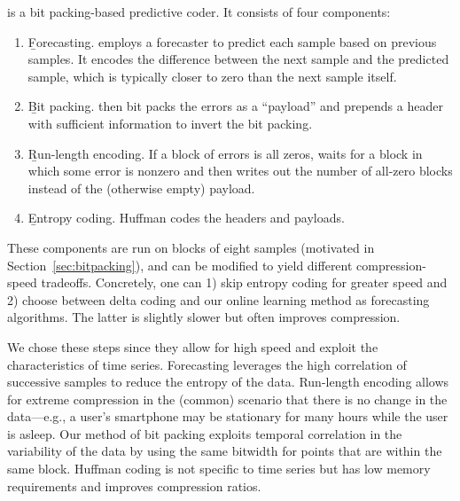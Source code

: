 \minesp is a bit packing-based predictive coder. It consists of four components:
\begin{enumerate}
\item \b{Forecasting.} \minesp employs a forecaster to predict each sample based on previous samples. It encodes the difference between the next sample and the predicted sample, which is typically closer to zero than the next sample itself.
\item \b{Bit packing.} \minesp then bit packs the errors as a ``payload'' and prepends a header with sufficient information to invert the bit packing.
\item \b{Run-length encoding.} If a block of errors is all zeros, \minesp waits for a block in which some error is nonzero and then writes out the number of all-zero blocks instead of the (otherwise empty) payload.
\item \b{Entropy coding.} \minesp Huffman codes the headers and payloads.
\end{enumerate}

These components are run on blocks of eight samples (motivated in Section~\ref{sec:bitpacking}), and can be modified to yield different compression-speed tradeoffs. Concretely, one can 1) skip entropy coding for greater speed and 2) choose between delta coding and our online learning method as forecasting algorithms. The latter is slightly slower but often improves compression.

We chose these steps since they allow for high speed and exploit the characteristics of time series. Forecasting leverages the high correlation of successive samples to reduce the entropy of the data. Run-length encoding allows for extreme compression in the (common) scenario that there is no change in the data---e.g., a user's smartphone may be stationary for many hours while the user is asleep. Our method of bit packing exploits temporal correlation in the variability of the data by using the same bitwidth for points that are within the same block. Huffman coding is not specific to time series but has low memory requirements and improves compression ratios.



